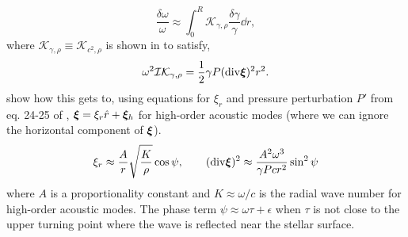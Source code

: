 %
\begin{equation}
    \frac{\delta\omega}{\omega} \approx \int_0^R \mathcal{K}_{\gamma,\rho} \frac{\delta\gamma}{\gamma} \dd r,\label{eq:delta-omega}
\end{equation}
%
where \(\mathcal{K}_{\gamma,\rho} \equiv \mathcal{K}_{c^2,\rho}\) is shown in \citet{Gough1993} to satisfy,
%
\begin{equation}
    \omega^2 \mathcal{I}\mathcal{K}_{\gamma,\rho} = \frac12 \gamma P (\mathrm{div} \bm{\xi})^2 r^2.\label{eq:gamma-kernel}
\end{equation}
%
show how this gets to, using equations for \(\xi_r\) and pressure perturbation \(P'\) from eq. 24-25 of \citet{Shibahashi1979}, \(\bm{\xi} = \xi_r \hat{r} + \bm{\xi}_h\) for high-order acoustic modes (where we can ignore the horizontal component of \(\bm{\xi}\)).
%
\begin{equation}
    \xi_r \approx \frac{A}{r}\sqrt{\frac{K}{\rho}} \cos\psi,\qquad
    (\mathrm{div} \bm{\xi})^2 \approx \frac{A^2 \omega^3}{\gamma P c r^2} \sin^2\psi \label{eq:xi-approx}
\end{equation}
%
where \(A\) is a proportionality constant and \(K \approx \omega / c\) is the radial wave number for high-order acoustic modes. The phase term \(\psi \approx \omega \tau + \epsilon\) when \(\tau\) is not close to the upper turning point where the wave is reflected near the stellar surface.

